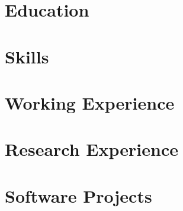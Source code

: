 \documentclass{resume}
\begin{document}

\newcommand{\equalcontrib}{$^{\dagger}$}




\section{Education}





\section{Skills}




\section{Working Experience}





\section{Research Experience}




\section{Software Projects}




\end{document}

